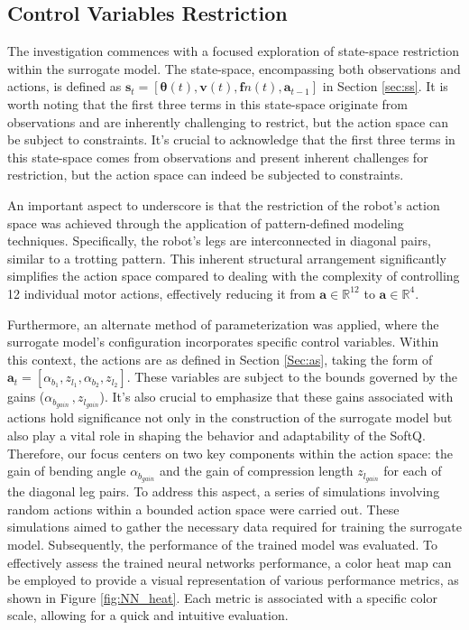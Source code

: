 \subsection{Control Variables Restriction}
The investigation commences with a focused exploration of state-space restriction within the surrogate model. The state-space, encompassing both observations and actions, is defined as $\mathbf{s}_t = [\pmb{\theta}(t), \mathbf{v}(t), \mathbf{f}n(t), \mathbf{a}_{t-1}]$ in Section \ref{sec:ss}. It is worth noting that the first three terms in this state-space originate from observations and are inherently challenging to restrict, but the action space can be subject to constraints.  It's crucial to acknowledge that the first three terms in this state-space comes from observations and present inherent challenges for restriction, but the action space can indeed be subjected to constraints. 

An important aspect to underscore is that the restriction of the robot's action space was achieved through the application of pattern-defined modeling techniques. Specifically, the robot's legs are interconnected in diagonal pairs, similar to a trotting pattern. This inherent structural arrangement significantly simplifies the action space compared to dealing with the complexity of controlling 12 individual motor actions\cite{jiSynthesizingOptimalGait2022}, effectively reducing it from $\mathbf{a}\in\mathbb{R}^{12}$ to $\mathbf{a}\in\mathbb{R}^4$. 

Furthermore, an alternate method of parameterization was applied, where the surrogate model's configuration incorporates specific control variables. Within this context, the actions are as defined in Section \ref{Sec:as}, taking the form of $\mathbf{a}_{t} = [\alpha_{b_1}, z_{l_1},\alpha_{b_2},z_{l_2}]$. These variables are subject to the bounds governed by the gains ($\alpha_{b_{gain}}\, , z_{l_{gain}}$). It's also crucial to emphasize that these gains associated with actions hold significance not only in the construction of the surrogate model but also play a vital role in shaping the behavior and adaptability of the SoftQ. Therefore, our focus centers on two key components within the action space: the gain of bending angle $\alpha_{b_{gain}}$ and the gain of compression length $z_{l_{gain}}$ for each of the diagonal leg pairs. To address this aspect, a series of simulations involving random actions within a bounded action space were carried out. These simulations aimed to gather the necessary data required for training the surrogate model. Subsequently, the performance of the trained model was evaluated. To effectively assess the trained neural networks performance, a color heat map can be employed to provide a visual representation of various performance metrics, as shown in Figure \ref{fig:NN_heat}. Each metric is associated with a specific color scale, allowing for a quick and intuitive evaluation.

